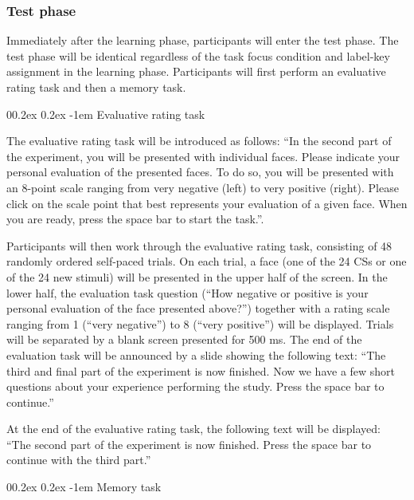\documentclass[
  doc,floatsintext]{apa6}
\makeatletter
\let\oldparagraph\paragraph
\renewcommand{\paragraph}[1]{\oldparagraph{#1}\mbox{}}
\renewcommand{\paragraph}{\@startsection{paragraph}{4}{\parindent}%
  {0\baselineskip \@plus 0.2ex \@minus 0.2ex}%
  {-1em}%
  {\normalfont\normalsize\bfseries\itshape\typesectitle}}
\makeatother
\begin{document}
\hypertarget{test-phase}{%
\subsubsection{Test phase}\label{test-phase}}

Immediately after the learning phase, participants will enter the test phase. The test phase will be identical regardless of the task focus condition and label-key assignment in the learning phase. Participants will first perform an evaluative rating task and then a memory task.

\hypertarget{evaluative-rating-task}{%
\paragraph{Evaluative rating task}\label{evaluative-rating-task}}

The evaluative rating task will be introduced as follows:
``In the second part of the experiment, you will be presented with individual faces.
Please indicate your personal evaluation of the presented faces.
To do so, you will be presented with an 8-point scale ranging from very negative (left) to very positive (right).
Please click on the scale point that best represents your evaluation of a given face.
When you are ready, press the space bar to start the task.''.

Participants will then work through the evaluative rating task, consisting of 48 randomly ordered self-paced trials. On each trial, a face (one of the 24 CSs or one of the 24 new stimuli) will be presented in the upper half of the screen. In the lower half, the evaluation task question (``How negative or positive is your personal evaluation of the face presented above?'') together with a rating scale ranging from 1 (``very negative'') to 8 (``very positive'') will be displayed.
Trials will be separated by a blank screen presented for 500 ms.
The end of the evaluation task will be announced by a slide showing the following text: ``The third and final part of the experiment is now finished. Now we have a few short questions about your experience performing the study. Press the space bar to continue.''

At the end of the evaluative rating task, the following text will be displayed:
``The second part of the experiment is now finished.
Press the space bar to continue with the third part.''

\hypertarget{memory-task}{%
\paragraph{Memory task}\label{memory-task}}
\end{document}
